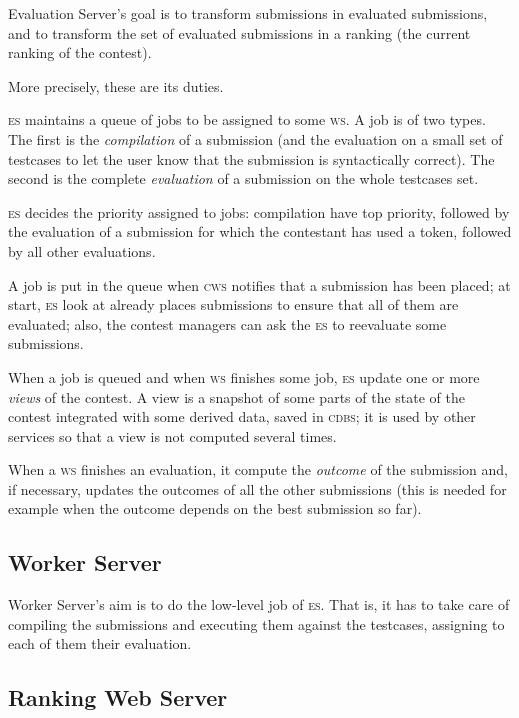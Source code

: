 \documentclass[a4paper,8pt]{amsart}
\newcommand{\CDBS}{\textsc{cdbs}}
\newcommand{\CWS}{\textsc{cws}}
\newcommand{\ES}{\textsc{es}}
\newcommand{\WS}{\textsc{ws}}
\newenvironment{squishlist}{%
  \begin{list}{\textbullet}%
    { \setlength{\itemsep}{0pt}%
      \setlength{\parsep}{3pt}%
      \setlength{\topsep}{3pt}%
      \setlength{\partopsep}{0pt}%
      \setlength{\leftmargin}{1.5em}%
      \setlength{\labelwidth}{1em}%
      \setlength{\labelsep}{0.5em} }%
}{\end{list}}
\begin{document}
\begin{multicols}{2}
  Evaluation Server's goal is to transform submissions in evaluated
  submissions, and to transform the set of evaluated submissions in a
  ranking (the current ranking of the contest).

  More precisely, these are its duties.
  \begin{squishlist}
  \item \ES{} maintains a queue of jobs to be assigned to some
    \WS{}. A job is of two types. The first is the
    \emph{compilation\/} of a submission (and the evaluation on a
    small set of testcases to let the user know that the submission is
    syntactically correct). The second is the complete
    \emph{evaluation\/} of a submission on the whole testcases set.
  \item \ES{} decides the priority assigned to jobs: compilation have
    top priority, followed by the evaluation of a submission for which
    the contestant has used a token, followed by all other
    evaluations.
  \item A job is put in the queue when \CWS{} notifies that a
    submission has been placed; at start, \ES{} look at already places
    submissions to ensure that all of them are evaluated; also, the
    contest managers can ask the \ES{} to reevaluate some submissions.
  \item When a job is queued and when \WS{} finishes some job, \ES{}
    update one or more \emph{views\/} of the contest. A view is a
    snapshot of some parts of the state of the contest integrated with
    some derived data, saved in \CDBS{}; it is used by other services
    so that a view is not computed several times.
  \item When a \WS{} finishes an evaluation, it compute the
    \emph{outcome\/} of the submission and, if necessary, updates the
    outcomes of all the other submissions (this is needed for example
    when the outcome depends on the best submission so far).
  \end{squishlist}

  \subsection{Worker Server}

  Worker Server's aim is to do the low-level job of \ES{}. That is, it
  has to take care of compiling the submissions and executing them
  against the testcases, assigning to each of them their evaluation.

  \subsection{Ranking Web Server}


\end{multicols}
\end{document}
